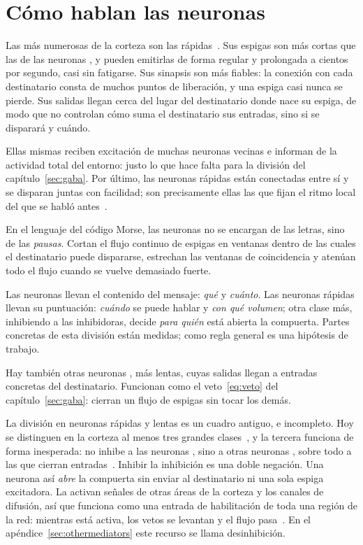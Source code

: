 \section{Cómo hablan las neuronas }

Las más numerosas de la corteza son las rápidas~\cite{Tremblay2016}. Sus espigas son más cortas que las de las neuronas , y pueden emitirlas de forma regular y prolongada a cientos por segundo, casi sin fatigarse. Sus sinapsis son más fiables: la conexión con cada destinatario consta de muchos puntos de liberación, y una espiga casi nunca se pierde. Sus salidas llegan cerca del lugar del destinatario donde nace su espiga, de modo que no controlan cómo suma el destinatario sus entradas, sino si se disparará y cuándo.

Ellas mismas reciben excitación de muchas neuronas  vecinas e informan de la actividad total del entorno: justo lo que hace falta para la división del capítulo~\ref{sec:gaba}. Por último, las neuronas  rápidas están conectadas entre sí y se disparan juntas con facilidad; son precisamente ellas las que fijan el ritmo local del que se habló antes~\cite{Cardin2009}.

En el lenguaje del código Morse, las neuronas  no se encargan de las letras, sino de las \emph{pausas}. Cortan el flujo continuo de espigas  en ventanas dentro de las cuales el destinatario puede dispararse, estrechan las ventanas de coincidencia y atenúan todo el flujo cuando se vuelve demasiado fuerte.

\begin{keyblock}
\begin{proposition}
\label{prop:punctuation}
Las neuronas  llevan el contenido del mensaje: \emph{qué} y \emph{cuánto}. Las neuronas  rápidas llevan su puntuación: \emph{cuándo} se puede hablar y \emph{con qué volumen}; otra clase más, inhibiendo a las inhibidoras, decide \emph{para quién} está abierta la compuerta. Partes concretas de esta división están medidas; como regla general es una hipótesis de trabajo.
\end{proposition}
\end{keyblock}

Hay también otras neuronas , más lentas, cuyas salidas llegan a entradas concretas del destinatario. Funcionan como el veto~\eqref{eq:veto} del capítulo~\ref{sec:gaba}: cierran un flujo de espigas  sin tocar los demás.

La división en neuronas  rápidas y lentas es un cuadro antiguo, e incompleto. Hoy se distinguen en la corteza al menos tres grandes clases~\cite{Tremblay2016}, y la tercera funciona de forma inesperada: no inhibe a las neuronas , sino a otras neuronas , sobre todo a las que cierran entradas~\cite{Pfeffer2013}. Inhibir la inhibición es una doble negación. Una neurona así \emph{abre} la compuerta sin enviar al destinatario ni una sola espiga excitadora. La activan señales de otras áreas de la corteza y los canales de difusión, así que funciona como una entrada de habilitación de toda una región de la red: mientras está activa, los vetos se levantan y el flujo pasa~\cite{Pi2013}. En el apéndice~\ref{sec:othermediators} este recurso se llama desinhibición.
